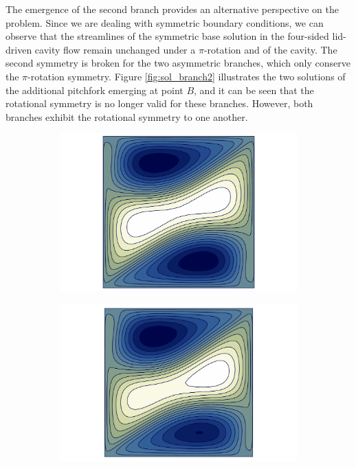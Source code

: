 The emergence of the second branch provides an alternative perspective on the
problem. Since we are dealing with symmetric boundary conditions, we can
observe that the streamlines of the symmetric base solution in the four-sided
lid-driven cavity flow remain unchanged under a $\pi$-rotation and  of the cavity. The second symmetry is broken for the
two asymmetric branches, which only conserve the $\pi$-rotation symmetry.
Figure \ref{fig:sol_branch2} illustrates the two solutions of the additional
pitchfork emerging at point $B$, and it can be seen that the rotational
symmetry is no longer valid for these branches. However, both branches exhibit
the rotational symmetry to one another.

\begin{figure}[h!]
\begin{subfigure}[b]{0.33\textwidth}
  \centering
  \includegraphics[trim={2cm 0 2cm 0},clip,width=\textwidth]{figs/psi_Re353.356_pf3.pdf}
\end{subfigure}
\begin{subfigure}[b]{0.33\textwidth}
  \centering
  \includegraphics[trim={2cm 0 2cm 0},clip,width=\textwidth]{figs/psi_Re375.000_branch2_u_t_smaller.pdf}

\end{subfigure}
\end{figure}
